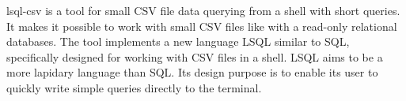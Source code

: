\documentclass[a4paper]{article}
\begin{document}
lsql-csv is a tool for small CSV file data querying from a shell with short
  queries. It makes it possible to work with small CSV files like with a read-only
  relational databases. The tool implements a new language LSQL similar to SQL,
  specifically designed for working with CSV files in a shell. 
  LSQL aims to be a more lapidary language than SQL.
  Its design purpose is to enable its user to quickly write simple queries directly
  to the terminal.
\end{document}
